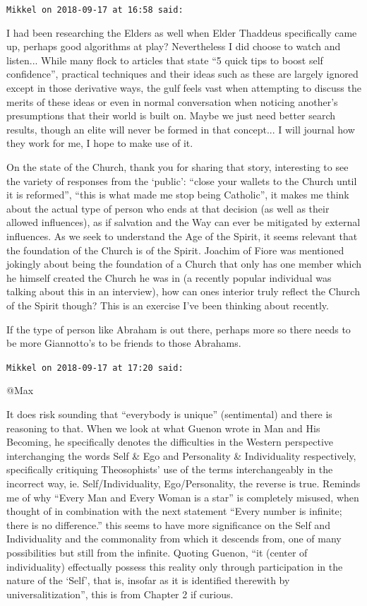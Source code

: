 \begin{footnotesize}
\begin{sffamily}
\hfill

\texttt{Mikkel on 2018-09-17 at 16:58 said:}

I had been researching the Elders as well when Elder Thaddeus specifically came up, perhaps good algorithms at play? Nevertheless I did choose to watch and listen... While many flock to articles that state ``5 quick tips to boost self confidence'', practical techniques and their ideas such as these are largely ignored except in those derivative ways, the gulf feels vast when attempting to discuss the merits of these ideas or even in normal conversation when noticing another's presumptions that their world is built on. Maybe we just need better search results, though an elite will never be formed in that concept... I will journal how they work for me, I hope to make use of it.

On the state of the Church, thank you for sharing that story, interesting to see the variety of responses from the `public': ``close your wallets to the Church until it is reformed'', ``this is what made me stop being Catholic'', it makes me think about the actual type of person who ends at that decision (as well as their allowed influences), as if salvation and the Way can ever be mitigated by external influences. As we seek to understand the Age of the Spirit, it seems relevant that the foundation of the Church is of the Spirit. Joachim of Fiore was mentioned jokingly about being the foundation of a Church that only has one member which he himself created the Church he was in (a recently popular individual was talking about this in an interview), how can ones interior truly reflect the Church of the Spirit though? This is an exercise I've been thinking about recently.

If the type of person like Abraham is out there, perhaps more so there needs to be more Giannotto's to be friends to those Abrahams.

\hfill

\texttt{Mikkel on 2018-09-17 at 17:20 said:}

@Max

It does risk sounding that ``everybody is unique'' (sentimental) and there is reasoning to that. When we look at what Guenon wrote in Man and His Becoming, he specifically denotes the difficulties in the Western perspective interchanging the words Self \& Ego and Personality \& Individuality respectively, specifically critiquing Theosophists' use of the terms interchangeably in the incorrect way, ie. Self/Individuality, Ego/Personality, the reverse is true. Reminds me of why ``Every Man and Every Woman is a star'' is completely misused, when thought of in combination with the next statement ``Every number is infinite; there is no difference.'' this seems to have more significance on the Self and Individuality and the commonality from which it descends from, one of many possibilities but still from the infinite. Quoting Guenon, ``it (center of individuality) effectually possess this reality only through participation in the nature of the `Self', that is, insofar as it is identified therewith by universalitization'', this is from Chapter 2 if curious.


\end{sffamily}
\end{footnotesize}
